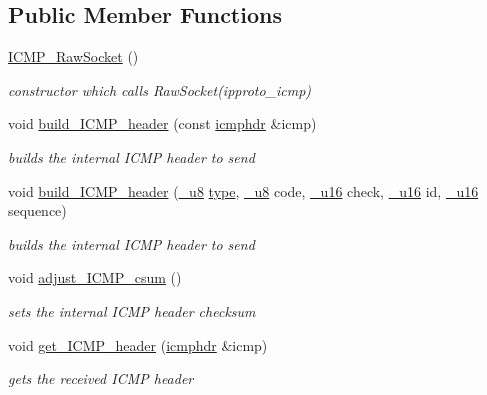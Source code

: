 \subsection*{Public Member Functions}
\begin{CompactItemize}
\item 
\hyperlink{classsocketpp_1_1ICMP__RawSocket_bed3b5ca33a0f7b4be42a9e6167266c0}{ICMP\_\-RawSocket} ()
\begin{CompactList}\small\item\em constructor which calls RawSocket(ipproto\_\-icmp) \item\end{CompactList}\item 
void \hyperlink{classsocketpp_1_1ICMP__RawSocket_7d8d54d4771f4012246835819421fbeb}{build\_\-ICMP\_\-header} (const \hyperlink{structsocketpp_1_1icmphdr}{icmphdr} \&icmp)
\begin{CompactList}\small\item\em builds the internal ICMP header to send \item\end{CompactList}\item 
void \hyperlink{classsocketpp_1_1ICMP__RawSocket_d97b59bf0442ecd08b3660cafd2a5a3f}{build\_\-ICMP\_\-header} (\hyperlink{namespacesocketpp_1398da7d8125cdb32e89041e5b0adb96}{\_\-u8} \hyperlink{namespacesocketpp_635f4c3b3f85aba331587404d59ae52d}{type}, \hyperlink{namespacesocketpp_1398da7d8125cdb32e89041e5b0adb96}{\_\-u8} code, \hyperlink{namespacesocketpp_0d48e817f00cbb84d07faec41ee4b169}{\_\-u16} check, \hyperlink{namespacesocketpp_0d48e817f00cbb84d07faec41ee4b169}{\_\-u16} id, \hyperlink{namespacesocketpp_0d48e817f00cbb84d07faec41ee4b169}{\_\-u16} sequence)
\begin{CompactList}\small\item\em builds the internal ICMP header to send \item\end{CompactList}\item 
void \hyperlink{classsocketpp_1_1ICMP__RawSocket_ab00bba6ed9fe98ca771fc3310983c97}{adjust\_\-ICMP\_\-csum} ()
\begin{CompactList}\small\item\em sets the internal ICMP header checksum \item\end{CompactList}\item 
void \hyperlink{classsocketpp_1_1ICMP__RawSocket_9b0ed9bb87d2895f2302db13b7ca5f06}{get\_\-ICMP\_\-header} (\hyperlink{structsocketpp_1_1icmphdr}{icmphdr} \&icmp)
\begin{CompactList}\small\item\em gets the received ICMP header \item\end{CompactList}\end{CompactItemize}
